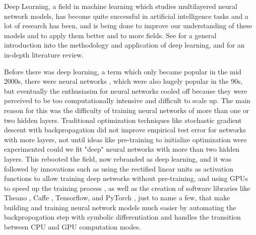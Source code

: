 \documentclass[12pt]{report}
\begin{document}
Deep Learning, a field in machine learning which studies multilayered neural network models,  has become quite successful in artificial intelligence tasks and a lot of research has been,  and is being done to improve our understanding of these models and to apply them better and to more fields. See \cite{goodfellow2016deep,lecun2015deep} for a general introduction into the methodology and application of deep learning, and \cite{schmidhuber2015deep} for an in-depth literature review. 

Before there was deep learning, a term which only became popular in the mid 2000s, there were neural networks \cite{bishop1995neural,ripley2007pattern}, which were also hugely popular in the 90s, but eventually the enthusiasim for neural networks cooled off because they were perceived to be too computationally intensive and difficult to scale up. The main reason for this was the difficulty of training neural networks of more than one or two hidden layers. Traditional optimization techniques like stochastic gradient descent with backpropagation did not improve empirical test error for networks with more layers, not until ideas like pre-training to initialize optimization were experimented could we fit "deep" neural networks with more than two hidden layers. This rebooted the field, now rebranded as deep learning,  and it was followed by innovations such as using the rectified linear units as activation functions \cite{nair2010rectified} to allow training deep networks without pre-training, and using GPUs to speed up the training process \cite{krizhevsky2012imagenet}, as well as the creation of software libraries like Theano \cite{bergstra2010theano}, Caffe \cite{jia2014caffe}, Tensorflow\cite{tensorflow2015-whitepaper}, and PyTorch \cite{paszke2017automatic}, just to name a few, that make building and training neural network models much easier by automating the backpropogation step with symbolic differentiation \cite{bahrampour2015comparative} and handles the transition between CPU and GPU computation modes. 
\end{document}
